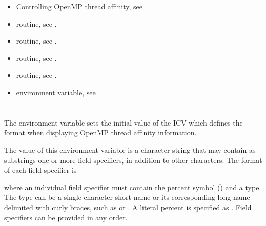 \crossreferences
\begin{itemize}
\item Controlling OpenMP thread affinity, 
see .

\item {} routine, 
see .

\item {} routine, 
see .

\item {} routine, 
see .

\item {} routine, 
see .

\item {} environment variable, 
see .
\end{itemize}



\section{}
\label{sec:OMP_AFFINITY_FORMAT}

The  environment variable sets the initial value of the
 ICV which defines the format when displaying OpenMP
thread affinity information.

The value of this environment variable is a character string that may contain as
substrings one or more field specifiers, in addition to other characters.
The format of each field specifier is

\begin{ompSyntax}
\end{ompSyntax}

where an individual field specifier must contain the percent symbol 
({\pcode{\%}}) and a type. The type can be a single character short 
name or its corresponding long name delimited with curly braces,
 such as {} or {}. A literal percent 
is specified as {\pcode{\%\%}}.  Field specifiers can be provided in any order.

